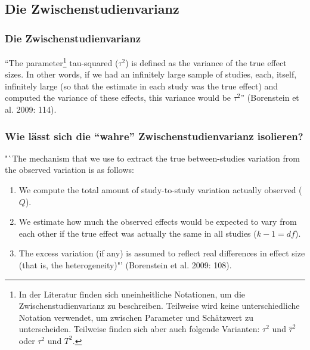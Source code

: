 \subsection{Die Zwischenstudienvarianz}\label{sec:tau}

\begin{frame}
  \frametitle{Die Zwischenstudienvarianz}
  "`The parameter\footnote{In der Literatur finden sich uneinheitliche Notationen, um die Zwischenstudienvarianz zu
    beschreiben. Teilweise wird keine unterschiedliche Notation verwendet, um zwischen Parameter und Schätzwert zu
    unterscheiden. Teilweise finden sich aber auch folgende Varianten: $\tau^2$ und $\widehat{\tau}^2$ oder $\tau^2$ und
    $T^2$. } tau-squared ($\tau^2$) is defined as the variance of the true effect sizes. In other words, if we had
  an infinitely large sample of studies, each, itself, infinitely large (so that the estimate in each study was the true
  effect) and computed the variance of these effects, this variance would be $\tau^2$"' (Borenstein et al. 2009: 114).
\end{frame}


\begin{frame}
  \frametitle{Wie lässt sich die "`wahre"' Zwischenstudienvarianz isolieren?}

"`The mechanism that we use to extract the true between-studies variation from the observed variation is as follows:

\begin{enumerate}[<+->]
\item<+-> We compute the total amount of study-to-study variation actually observed ($Q$).
\item<+-> We estimate how much the observed effects would be expected to vary from each other if the true effect was
  actually the same in all studies ($k-1 = df$).
\item<+-> The excess variation (if any) is assumed to reflect real differences in effect size (that is, the
  heterogeneity)"' (Borenstein et al. 2009: 108).
\end{enumerate}
\end{frame}



